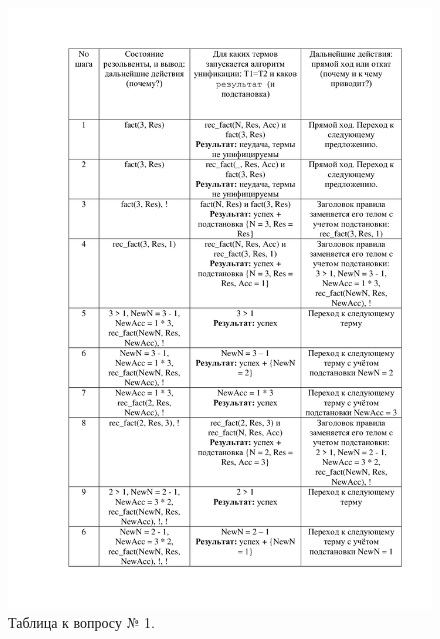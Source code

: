 \documentclass[14pt]{report}
\begin{document}
\begin{figure}[H]
	\centering
	\includegraphics[scale=0.26]{0.jpg}
	\caption{Таблица к вопросу № 1.}
	\label{d:matr_rec}
\end{figure}
\end{document}
